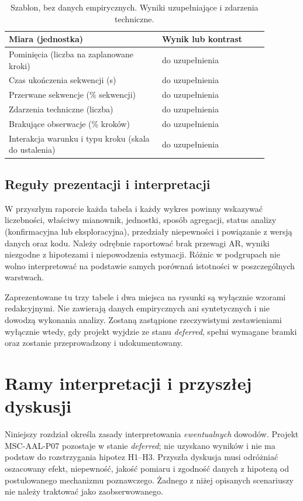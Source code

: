 \documentclass[11pt,a4paper]{article}
\begin{document}
\begin{table}[htbp]
\centering
\small
\caption{Szablon, bez danych empirycznych. Wyniki uzupełniające i zdarzenia techniczne.}
\label{tab:aal07-secondary}
\begin{tabular}{p{0.52\linewidth}p{0.36\linewidth}}
\hline
Miara (jednostka) & Wynik lub kontrast \\
\hline
Pominięcia (liczba na zaplanowane kroki) & do uzupełnienia \\
Czas ukończenia sekwencji (s) & do uzupełnienia \\
Przerwane sekwencje (\% sekwencji) & do uzupełnienia \\
Zdarzenia techniczne (liczba) & do uzupełnienia \\
Brakujące obserwacje (\% kroków) & do uzupełnienia \\
Interakcja warunku i typu kroku (skala do ustalenia) & do uzupełnienia \\
\hline
\end{tabular}
\end{table}

\subsection{Reguły prezentacji i interpretacji}
W przyszłym raporcie każda tabela i każdy wykres powinny wskazywać liczebności, właściwy mianownik, jednostki, sposób agregacji, status analizy (konfirmacyjna lub eksploracyjna), przedziały niepewności i powiązanie z wersją danych oraz kodu. Należy odrębnie raportować brak przewagi AR, wyniki niezgodne z hipotezami i niepowodzenia estymacji. Różnic w podgrupach nie wolno interpretować na podstawie samych porównań istotności w poszczególnych warstwach.

Zaprezentowane tu trzy tabele i dwa miejsca na rysunki są wyłącznie wzorami redakcyjnymi. Nie zawierają danych empirycznych ani syntetycznych i nie dowodzą wykonania analizy. Zostaną zastąpione rzeczywistymi zestawieniami wyłącznie wtedy, gdy projekt wyjdzie ze stanu \textit{deferred}, spełni wymagane bramki oraz zostanie przeprowadzony i udokumentowany.

\section{Ramy interpretacji i przyszłej dyskusji}
Niniejszy rozdział określa zasady interpretowania \emph{ewentualnych} dowodów. Projekt MSC-AAL-P07 pozostaje w stanie \textit{deferred}; nie uzyskano wyników i nie ma podstaw do rozstrzygania hipotez H1--H3. Przyszła dyskusja musi odróżniać oszacowany efekt, niepewność, jakość pomiaru i zgodność danych z hipotezą od postulowanego mechanizmu poznawczego. Żadnego z niżej opisanych scenariuszy nie należy traktować jako zaobserwowanego.
\end{document}
